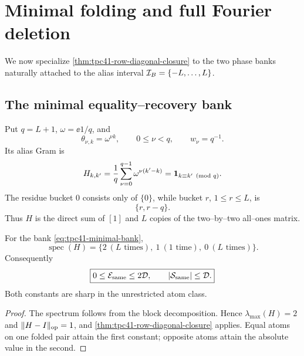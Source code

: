 \section{Minimal folding and full Fourier deletion}
\label{sec:tpc41-banks}

We now specialize \cref{thm:tpc41-row-diagonal-closure} to the two phase
banks naturally attached to the alias interval
\(\mathcal I_B=\{-L,\ldots,L\}\).

\subsection{The minimal equality--recovery bank}

Put \(q=L+1\), \(\omega=\ee{1/q}\), and
\begin{equation}
 \theta_{\nu,k}=\omega^{\nu k},
 \qquad 0\le\nu<q,
 \qquad w_\nu=q^{-1}.
 \label{eq:tpc41-minimal-bank}
\end{equation}
Its alias Gram is
\begin{equation}
 H_{k,k'}
 =\frac1q\sum_{\nu=0}^{q-1}\omega^{\nu(k'-k)}
 =\mathbf 1_{k\equiv k'\pmod q}.
 \label{eq:tpc41-minimal-H}
\end{equation}
The residue bucket \(0\) consists only of \(\{0\}\), while bucket
\(r\), \(1\le r\le L\), is
\begin{equation}
 \{r,r-q\}.
 \label{eq:tpc41-folded-pairs}
\end{equation}
Thus \(H\) is the direct sum of \([1]\) and \(L\) copies of the
two--by--two all--ones matrix.

\begin{corollary}
\label{cor:tpc41-minimal-row-closure}
For the bank \eqref{eq:tpc41-minimal-bank},
\begin{equation}
 \operatorname{spec}(H)
 =\{2\ (L\text{ times}),\ 1\ (1\text{ time}),\ 0\ (L\text{ times})\}.
 \label{eq:tpc41-minimal-spectrum}
\end{equation}
Consequently
\begin{equation}
 \boxed{
 0\le\mathcal E_{\rm same}\le2\mathcal D,
 \qquad
 |\mathcal S_{\rm same}|\le\mathcal D.}
 \label{eq:tpc41-minimal-row-bounds}
\end{equation}
Both constants are sharp in the unrestricted atom class.
\end{corollary}

\begin{proof}
The spectrum follows from the block decomposition.  Hence
\(\lambda_{\max}(H)=2\) and \(\|H-I\|_{\operatorname{op}}=1\), and
\cref{thm:tpc41-row-diagonal-closure} applies.  Equal atoms on one folded
pair attain the first constant; opposite atoms attain the absolute value
in the second.
\end{proof}

